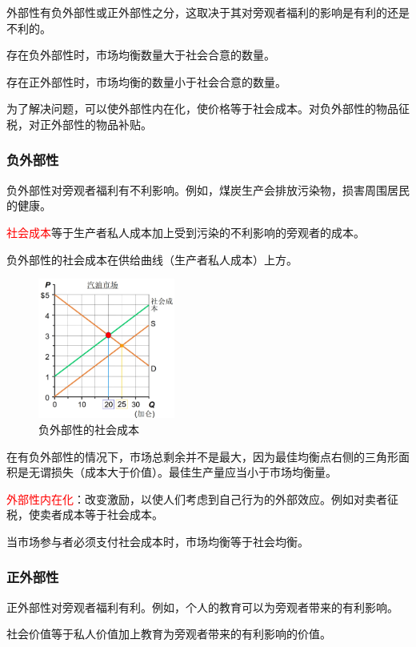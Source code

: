 \documentclass[12pt, a4paper]{article}
\begin{document}
外部性有负外部性或正外部性之分，这取决于其对旁观者福利的影响是有利的还是不利的。

存在负外部性时，市场均衡数量大于社会合意的数量。

存在正外部性时，市场均衡的数量小于社会合意的数量。

为了解决问题，可以使外部性内在化，使价格等于社会成本。对负外部性的物品征税，对正外部性的物品补贴。

\subsubsection{负外部性}
负外部性对旁观者福利有不利影响。例如，煤炭生产会排放污染物，损害周围居民的健康。

\textcolor{red}{社会成本}等于生产者私人成本加上受到污染的不利影响的旁观者的成本。

负外部性的社会成本在供给曲线（生产者私人成本）上方。

\begin{figure}[H]
  \centering
  \includegraphics[width=0.4\textwidth]{负外部性.png}
  \caption{负外部性的社会成本}
\end{figure}

在有负外部性的情况下，市场总剩余并不是最大，因为最佳均衡点右侧的三角形面积是无谓损失（成本大于价值）。最佳生产量应当小于市场均衡量。

\textcolor{red}{外部性内在化}：改变激励，以使人们考虑到自己行为的外部效应。例如对卖者征税，使卖者成本等于社会成本。

当市场参与者必须支付社会成本时，市场均衡等于社会均衡。

\subsubsection{正外部性}
正外部性对旁观者福利有利。例如，个人的教育可以为旁观者带来的有利影响。

社会价值等于私人价值加上教育为旁观者带来的有利影响的价值。
\end{document}
